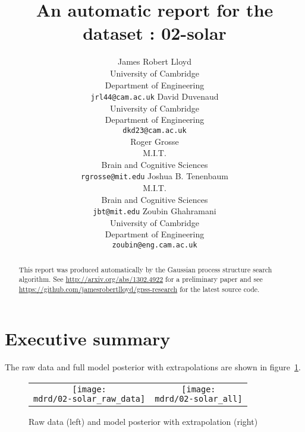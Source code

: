 \documentclass{article} %
\title{An automatic report for the dataset : 02-solar}
\author{
James Robert Lloyd\\
University of Cambridge\\
Department of Engineering\\
\texttt{jrl44@cam.ac.uk}
\And
David Duvenaud\\
University of Cambridge \\
Department of Engineering \\
\texttt{dkd23@cam.ac.uk} \\
\And
Roger Grosse\\
M.I.T.\\
Brain and Cognitive Sciences \\
\texttt{rgrosse@mit.edu}
\And
Joshua B. Tenenbaum\\
M.I.T.\\
Brain and Cognitive Sciences \\
\texttt{jbt@mit.edu}
\And
Zoubin Ghahramani\\
University of Cambridge \\
Department of Engineering \\
\texttt{zoubin@eng.cam.ac.uk}
}
\begin{document}
\allowdisplaybreaks

\maketitle

\begin{abstract}
This report was produced automatically by the Gaussian process structure search algorithm.
See \url{http://arxiv.org/abs/1302.4922} for a preliminary paper and see \url{https://github.com/jamesrobertlloyd/gpss-research} for the latest source code.
\end{abstract}

\section{Executive summary}

The raw data and full model posterior with extrapolations are shown in figure~\ref{fig:rawandfit}.

\begin{figure}[H]
\newcommand{\wmgd}{0.5\columnwidth}
\newcommand{\hmgd}{3.0cm}
\newcommand{\mdrd}{figures/02-solar}
\newcommand{\mbm}{\hspace{-0.3cm}}
\begin{tabular}{cc}
\mbm \texttt{[image: \\mdrd/02-solar\_raw\_data]} & \texttt{[image: \\mdrd/02-solar\_all]}
\end{tabular}
\caption{Raw data (left) and model posterior with extrapolation (right)}
\label{fig:rawandfit}
\end{figure}
\end{document}
